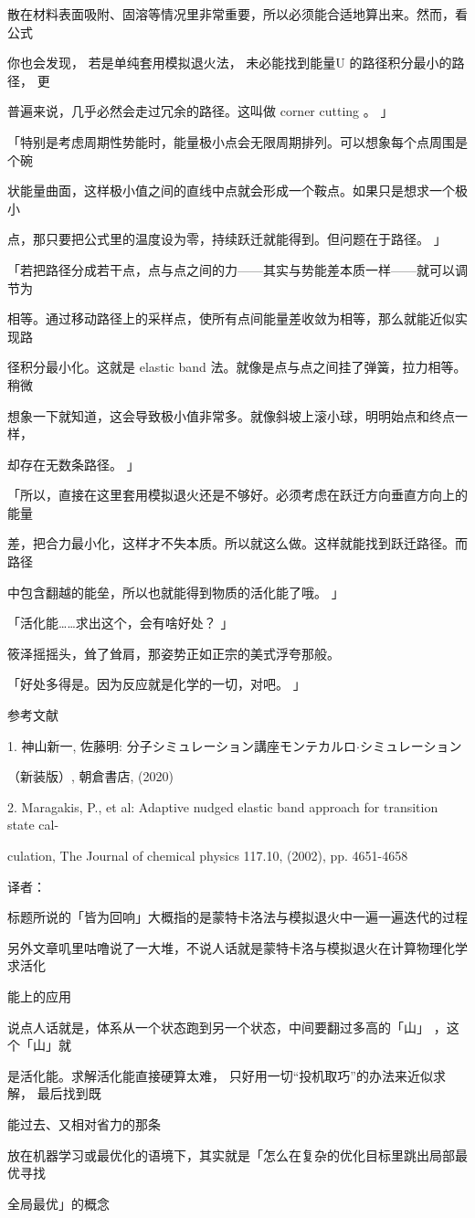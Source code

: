散在材料表面吸附、固溶等情况里非常重要，所以必须能合适地算出来。然而，看公式\par
你也会发现， 若是单纯套用模拟退火法， 未必能找到能量U 的路径积分最小的路径， 更\par
普遍来说，几乎必然会走过冗余的路径。这叫做 corner cutting 。 」\par
「特别是考虑周期性势能时，能量极小点会无限周期排列。可以想象每个点周围是个碗\par
状能量曲面，这样极小值之间的直线中点就会形成一个鞍点。如果只是想求一个极小\par
点，那只要把公式里的温度设为零，持续跃迁就能得到。但问题在于路径。 」\par
「若把路径分成若干点，点与点之间的力——其实与势能差本质一样——就可以调节为\par
相等。通过移动路径上的采样点，使所有点间能量差收敛为相等，那么就能近似实现路\par
径积分最小化。这就是 elastic band 法。就像是点与点之间挂了弹簧，拉力相等。稍微\par
想象一下就知道，这会导致极小值非常多。就像斜坡上滚小球，明明始点和终点一样，\par
却存在无数条路径。 」\par
「所以，直接在这里套用模拟退火还是不够好。必须考虑在跃迁方向垂直方向上的能量\par
差，把合力最小化，这样才不失本质。所以就这么做。这样就能找到跃迁路径。而路径\par
中包含翻越的能垒，所以也就能得到物质的活化能了哦。 」\par
「活化能……求出这个，会有啥好处？ 」\par

筱泽摇摇头，耸了耸肩，那姿势正如正宗的美式浮夸那般。\par
「好处多得是。因为反应就是化学的一切，对吧。 」\par
参考文献\par
1. 神山新一, 佐藤明: 分子シミュレーション講座モンテカルロ$\cdot$シミュレーション\par
（新装版）, 朝倉書店, (2020)\par
2. Maragakis, P., et al: Adaptive nudged elastic band approach for transition state cal-\par
culation, The Journal of chemical physics 117.10, (2002), pp. 4651-4658\par

译者：\par
标题所说的「皆为回响」大概指的是蒙特卡洛法与模拟退火中一遍一遍迭代的过程\par
另外文章叽里咕噜说了一大堆，不说人话就是蒙特卡洛与模拟退火在计算物理化学求活化\par
能上的应用\par
说点人话就是，体系从一个状态跑到另一个状态，中间要翻过多高的「山」 ，这个「山」就\par
是活化能。求解活化能直接硬算太难， 只好用一切“投机取巧”的办法来近似求解， 最后找到既\par
能过去、又相对省力的那条\par
放在机器学习或最优化的语境下，其实就是「怎么在复杂的优化目标里跳出局部最优寻找\par
全局最优」的概念\par
\endgroup
\clearpage
